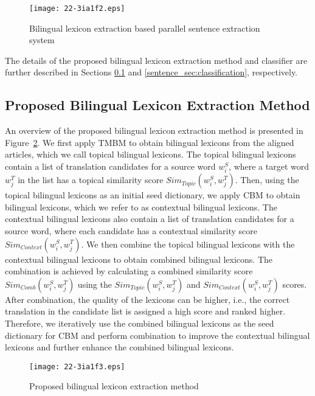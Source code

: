 \documentclass[english]{jnlp_1.4}
\begin{document}
\begin{figure}[t]
\begin{center}
\texttt{[image: 22-3ia1f2.eps]}
\end{center}
\caption{Bilingual lexicon extraction based parallel sentence extraction system}
\label{overview}
\end{figure}

The details of the proposed bilingual lexicon extraction method and classifier are further 
described in Sections \ref{lexicon_sec:classification} and \ref{sentence_sec:classification}, respectively.


\subsection{Proposed Bilingual Lexicon Extraction Method}
\label{lexicon_sec:classification}

An overview of the proposed bilingual lexicon extraction method is
presented in Figure~\ref{lexicon_fig:method}. We first apply TMBM to obtain
bilingual lexicons from the aligned articles, which we
call topical bilingual lexicons. The topical bilingual lexicons contain
a list of translation candidates for a source word $w_i^S$, where a
target word $w_j^T$ in the list has a topical similarity score $Sim_{Topic}(w_i^S,w_j^T)$.
Then, using the topical bilingual lexicons as an initial seed dictionary,
we apply CBM to obtain bilingual lexicons, which we
refer to as contextual bilingual lexicons. The contextual bilingual lexicons
also contain a list of translation candidates for a source word, where
each candidate has a contextual similarity score
$Sim_{Context}(w_i^S,w_j^T)$. We then combine the topical bilingual
lexicons with the contextual bilingual lexicons to obtain combined
bilingual lexicons. The combination is achieved by calculating a combined
similarity score $Sim_{Comb}(w_i^S,w_j^T)$ using the
$Sim_{Topic}(w_i^S,w_j^T)$ and $Sim_{Context}(w_i^S,w_j^T)$
scores. After combination, the quality of the lexicons can be
higher, i.e., the correct translation in the candidate list
is assigned a high score and ranked higher.
Therefore, we iteratively use the combined bilingual lexicons as
the seed dictionary for CBM and perform
combination to improve the contextual bilingual lexicons and further
enhance the combined bilingual lexicons.

\begin{figure}[t]
\begin{center}
\texttt{[image: 22-3ia1f3.eps]}
\end{center}
\caption{Proposed bilingual lexicon extraction method}
\label{lexicon_fig:method}
\end{figure}
\end{document}
